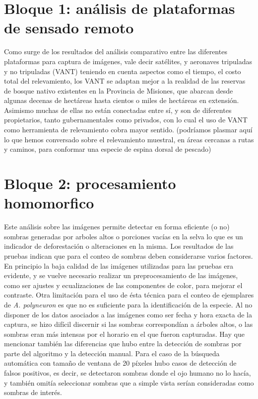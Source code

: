 \color{black} 
\section{Bloque 1: análisis de plataformas de sensado remoto}
Como surge de los resultados del análisis comparativo entre las diferentes plataformas para captura de imágenes, vale decir satélites, y aeronaves tripuladas y no tripuladas (VANT) teniendo en cuenta aspectos como el tiempo, el costo total del relevamiento, los VANT se adaptan mejor a la realidad de las reservas de bosque nativo existentes en la Provincia de Misiones, que abarcan desde algunas decenas de hectáreas hasta cientos o miles de hectáreas en extensión. Asimismo muchas de ellas no están conectadas entre sí, y son de diferentes propietarios, tanto gubernamentales como privados, con lo cual el uso de VANT como herramienta de relevamiento cobra mayor sentido. \color{magenta}(podríamos plasmar aquí lo que hemos conversado sobre el relevamiento muestral, en áreas cercanas a rutas y caminos, para conformar una especie de espina dorsal de pescado)
\color{black} 
\section{Bloque 2: procesamiento homomorfico}
Este análisis sobre las imágenes permite detectar en forma eficiente (o no) sombras generadas por arboles altos o porciones vacías en la selva lo que es un indicador de deforestación o alteraciones en la misma.
Los resultados de las pruebas indican que para el conteo de sombras deben considerarse varios factores. En principio la baja calidad de las imágenes utilizadas para las pruebas era evidente, y se vuelve necesario realizar un preprocesamiento de las imágenes, como ser ajustes y ecualizaciones de las componentes de color, para mejorar el contraste. Otra limitación para el uso de ésta técnica para el conteo de ejemplares de \textit{A. polyneuron} es que no es suficiente para la identificación de la especie. Al no disponer de los datos asociados a las imágenes como ser fecha y hora exacta de la captura, se hizo difícil discernir si las sombras correspondían a árboles altos, o las sombras eran más intensas por el horario en el que fueron capturadas. Hay que mencionar también las diferencias que hubo entre la detección de sombras por parte del algoritmo y la detección manual. Para el caso de la búsqueda automática con tamaño de ventana de 20 píxeles hubo casos de detección de falsos positivos, es decir, se detectaron sombras donde el ojo humano no lo hacía, y también omitía seleccionar sombras que a simple vista serían consideradas como sombras de interés. 

